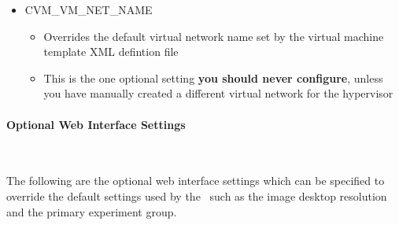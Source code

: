 \begin{itemize}
\item	CVM\_VM\_NET\_NAME
		\begin{itemize}
		\item	Overrides the default virtual network name set by the virtual machine
				template XML defintion file
		\item	This is the one optional setting {\bf you should never configure}, unless you have
	  			manually created a different virtual network for the hypervisor
		\end{itemize}


\end{itemize}


\paragraph*{Optional Web Interface Settings}~\newline

The following are the optional web interface settings which can be specified to override
the default settings used by the \cernvmtestframework\, such as the \cernvm image desktop
resolution and the primary experiment group.

